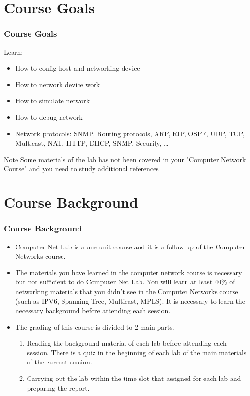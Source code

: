 \documentclass[aspectratio=169,15pt]{beamer}
\begin{document}
\section{Course Goals}
\begin{frame}
    \frametitle{Course Goals}

    Learn:
    \begin{itemize}
        \item How to config host and networking device
        \item How to network device work
        \item How to simulate network
        \item How to debug network
        \item Network protocols: SNMP, Routing protocols, ARP, RIP, OSPF, UDP, TCP, Multicast, NAT, HTTP, DHCP, SNMP, Security, \dots
    \end{itemize}

    \begin{alertblock}{Note}
        Some materials of the lab has not been covered in your "Computer Network Course" and you need to study additional references
    \end{alertblock}

\end{frame}

\section{Course Background}
\begin{frame}
    \frametitle{Course Background}

    \begin{itemize}
        \item Computer Net Lab is a one unit course and it is a follow up of the Computer Networks course.
        \item The materials you have learned in the computer network course is necessary but not sufficient to do Computer Net Lab.
        You will learn at least 40\% of networking materials that you didn’t see in the Computer Networks course (such as IPV6, Spanning Tree, Multicast, MPLS).
        It is necessary to learn the necessary background before attending each session.
        \item The grading of this course is divided to 2 main parts.
        \begin{enumerate}
            \item Reading the background material of each lab before attending each session.
            There is a quiz in the beginning of each lab of the main materials of the current session.
            \item Carrying out the lab within the time slot that assigned for each lab and preparing the report.
        \end{enumerate}
    \end{itemize}

\end{frame}
\end{document}

